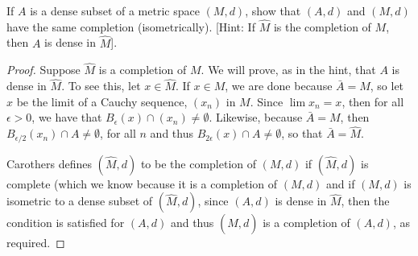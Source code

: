 \begin{exercise}{46}
If $A$ is a dense subset of a metric space $(M,d)$, show that $(A,d)$ and $(M,d)$ have the same completion (isometrically).
[Hint: If $\hat{M}$ is the completion of $M$, then $A$ is dense in $\hat{M}$].
\end{exercise}
\begin{proof}
Suppose $\hat{M}$ is a completion of $M$.
We will prove, as in the hint, that $A$ is dense in $\hat{M}$.
To see this, let $x\in \hat{M}$.
If $x\in M$, we are done because $\bar{A}=M$, so let $x$ be the limit of a Cauchy sequence, $(x_n)$ in $M$.
Since $\lim x_n = x$, then for all $\epsilon>0$, we have that $B_\epsilon(x)\cap (x_n) \neq \emptyset$.
Likewise, because $\bar{A}=M$, then $B_{\epsilon/2}(x_n)\cap A \neq \emptyset$, for all $n$ and thus $B_{2\epsilon}(x)\cap A\neq\emptyset$, so that $\bar{A}=\hat{M}$.

Carothers defines $(\hat{M},d)$ to be the completion of $(M,d)$ if $(\hat{M},d)$ is complete (which we know because it is a completion of $(M,d)$ and if $(M,d)$ is isometric to a dense subset of $(\hat{M},d)$, since $(A,d)$ is dense in $\hat{M}$, then the condition is satisfied for $(A,d)$ and thus $(\hat{M},d)$ is a completion of $(A,d)$, as required.
\end{proof} 
